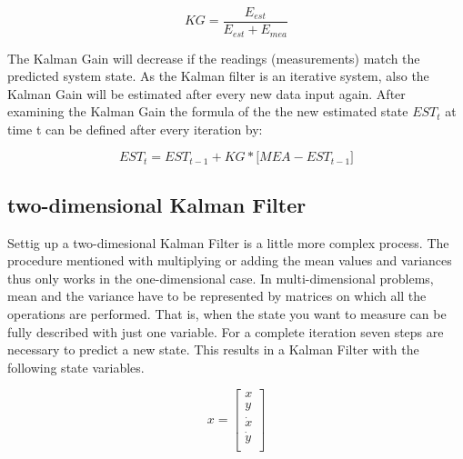 \begin{equation}
KG = \frac{E_{est}}{E_{est}+E_{mea}}
\label{kalman_gain_1dim}
\end{equation}


The Kalman Gain will decrease if the readings (measurements) match the predicted system state. As the Kalman filter is an iterative system, also the Kalman Gain will be estimated after every new data input again. After examining the Kalman Gain the formula of the the new estimated state $EST_t$ at time t can be defined after every iteration by:

\begin{equation}
EST_t = EST_{t-1} + KG * \big[MEA - EST_{t-1}\big]
\label{estimate_1dim}
\end{equation} 








\subsection{two-dimensional Kalman Filter}
Settig up a two-dimesional Kalman Filter is a little more complex process. The procedure mentioned with multiplying or
adding the mean values and variances thus only works in the one-dimensional case. In
multi-dimensional problems, mean and the variance have to be represented by matrices on
which all the operations are performed. That is, when the state you want to measure can
be fully described with just one variable. For a complete iteration seven steps are necessary to predict a new state.
This results in a Kalman Filter with the following state variables.


\begin{equation}
x = \begin{bmatrix} 
x \\
y \\
\dot{x} \\
\dot{y} \\
\end{bmatrix}
\end{equation}




